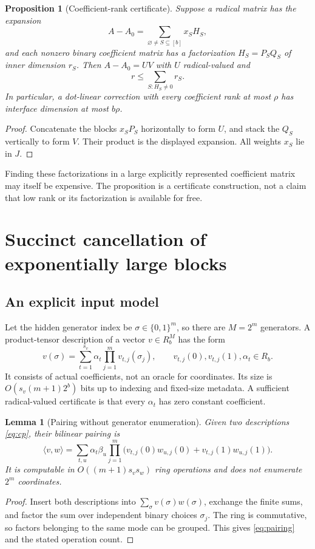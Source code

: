 \documentclass[11pt]{article}
\newtheorem{lemma}[theorem]{Lemma}
\newtheorem{proposition}[theorem]{Proposition}
\theoremstyle{definition}\newtheorem{definition}[theorem]{Definition}
\theoremstyle{remark}\newtheorem{remark}[theorem]{Remark}
\begin{document}
\begin{proposition}[Coefficient-rank certificate]\label{prop:coefficientrank}
Suppose a radical matrix has the expansion
\[
 A-A_0=\sum_{\varnothing\ne S\subseteq[b]}x_S H_S,
\]
and each nonzero binary coefficient matrix has a factorization $H_S=P_SQ_S$ of inner dimension $r_S$. Then $A-A_0=UV$ with $U$ radical-valued and
\[
 r\leq\sum_{S:H_S\ne0}r_S.
\]
In particular, a dot-linear correction with every coefficient rank at most $\rho$ has interface dimension at most $b\rho$.
\end{proposition}
\begin{proof}
Concatenate the blocks $x_SP_S$ horizontally to form $U$, and stack the $Q_S$ vertically to form $V$. Their product is the displayed expansion. All weights $x_S$ lie in $J$.
\end{proof}
Finding these factorizations in a large explicitly represented coefficient matrix may itself be expensive. The proposition is a certificate construction, not a claim that low rank or its factorization is available for free.

\section{Succinct cancellation of exponentially large blocks}
\label{sec:tensors}
\subsection{An explicit input model}
Let the hidden generator index be $\sigma\in\{0,1\}^m$, so there are $M=2^m$ generators. A product-tensor description of a vector $v\in R_b^M$ has the form
\begin{equation}\label{eq:cp}
 v(\sigma)=\sum_{t=1}^{s_v}\alpha_t
       \prod_{j=1}^m v_{t,j}(\sigma_j),
 \qquad v_{t,j}(0),v_{t,j}(1),\alpha_t\in R_b.
\end{equation}
It consists of actual coefficients, not an oracle for coordinates. Its size is $O(s_v(m+1)2^b)$ bits up to indexing and fixed-size metadata. A sufficient radical-valued certificate is that every $\alpha_t$ has zero constant coefficient.

\begin{lemma}[Pairing without generator enumeration]\label{lem:pairing}
Given two descriptions \eqref{eq:cp}, their bilinear pairing is
\begin{equation}\label{eq:pairing}
 \langle v,w\rangle
 =\sum_{t,u}\alpha_t\beta_u
      \prod_{j=1}^m
       \bigl(v_{t,j}(0)w_{u,j}(0)+v_{t,j}(1)w_{u,j}(1)\bigr).
\end{equation}
It is computable in $O((m+1)s_vs_w)$ ring operations and does not enumerate $2^m$ coordinates.
\end{lemma}
\begin{proof}
Insert both descriptions into $\sum_\sigma v(\sigma)w(\sigma)$, exchange the finite sums, and factor the sum over independent binary choices $\sigma_j$. The ring is commutative, so factors belonging to the same mode can be grouped. This gives \eqref{eq:pairing} and the stated operation count.
\end{proof}
\end{document}
